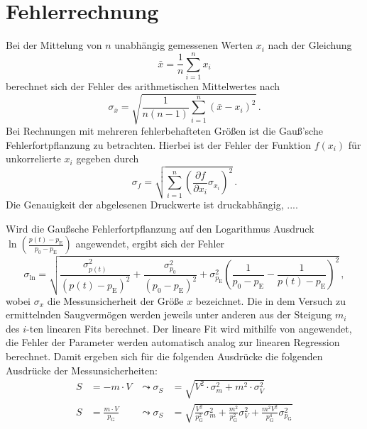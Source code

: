 \section{Fehlerrechnung}
\label{sec:fehler}

\noindent Bei der Mittelung von $n$ unabhängig gemessenen Werten $x_i$ nach der Gleichung 
\begin{equation*}
    \bar{x} = \frac{1}{n} \sum_{i=1}^n x_i
\end{equation*}
berechnet sich der Fehler des arithmetischen Mittelwertes nach
\begin{equation*}
    \sigma_{\bar{x}} = \sqrt{\frac{1}{n(n-1)}\sum_{i=1}^n \left( \bar{x} - x_i \right)^2}\, .
\end{equation*} 
Bei Rechnungen mit mehreren fehlerbehafteten Größen ist die Gauß'sche Fehlerfortpflanzung zu betrachten. Hierbei ist der Fehler der Funktion $f(x_i)$ 
für unkorrelierte $x_i$ gegeben durch
\begin{equation}
    \sigma_f = \sqrt{\sum_{i=1}^n \left(\frac{\partial f}{\partial x_i} \sigma_{x_i}\right)^2}\, .
    \label{eqn:gauss}
\end{equation}
Die Genauigkeit der abgelesenen Druckwerte ist druckabhängig, ....

\noindent Wird die Gaußsche Fehlerfortpflanzung auf den Logarithmus Ausdruck $\ln\left(\frac{p(t) - p_\text{E}}{p_0 - p_\text{E}}\right)$ angewendet, 
ergibt sich der Fehler 
\begin{equation}
    \sigma_{\ln} =\sqrt{\frac{\sigma^2_{p(t)}}{\left(p(t) - p_\text{E}\right)^2} + \frac{\sigma^2_{p_0}}{\left(p_0 - p_\text{E}\right)^2} 
                    + \sigma^2_{p_\text{E}} \left(\frac{1}{p_0 - p_\text{E}} - \frac{1}{p(t) - p_\text{E}}\right)^2 }\, , 
    \label{eqn:err_ln}
\end{equation}
wobei $\sigma_x$ die Messunsicherheit der Größe $x$ bezeichnet.
Die in dem Versuch zu ermittelnden Saugvermögen werden jeweils unter anderen aus der Steigung $m_i$ des $i$-ten linearen Fits berechnet. 
Der lineare Fit wird mithilfe von \cite{numpy} angewendet, die Fehler der Parameter werden automatisch analog zur linearen Regression berechnet. 
Damit ergeben sich für die folgenden Ausdrücke die folgenden Ausdrücke der Messunsicherheiten:
\begin{align}
    S &= - m \cdot V & \leadsto \sigma_S &= \sqrt{V^2\cdot \sigma_m^2 + m^2 \cdot \sigma_V^2} \label{eqn:err_saug_eva}\\
    S &= \frac{m\cdot V}{p_\text{G}} & \leadsto \sigma_S &= \sqrt{\frac{V^2}{p_\text{G}^2} \sigma_m^2 + \frac{m^2}{p_\text{G}^2} \sigma_V^2 + \frac{m^2V^2}{p_\text{G}^4} \sigma_{p_{\text{G}}}^2 } \label{eqn:err_saug_leck}
\end{align}